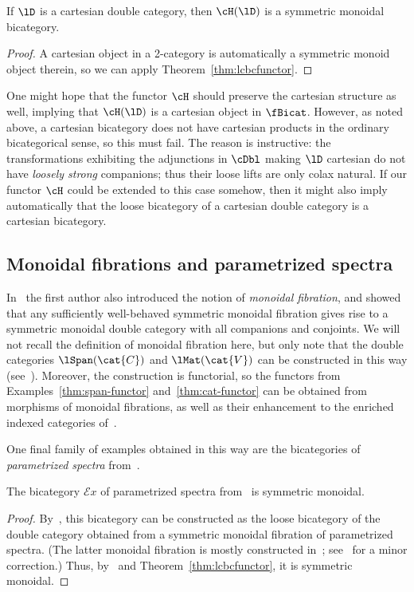 \begin{thm}
  If $\lD$ is a cartesian double category, then $\cH(\lD)$ is a symmetric monoidal bicategory.
\end{thm}
\begin{proof}
  A cartesian object in a 2-category is automatically a symmetric monoid object therein, so we can apply Theorem~\ref{thm:lcbcfunctor}.
\end{proof}

One might hope that the functor $\cH$ should preserve the cartesian structure as well, implying that $\cH(\lD)$ is a cartesian object in $\fBicat$.
However, as noted above, a cartesian bicategory does not have cartesian products in the ordinary bicategorical sense, so this must fail.
The reason is instructive: the transformations exhibiting the adjunctions in $\cDbl$ making $\lD$ cartesian do not have \emph{loosely strong} companions; thus their loose lifts are only colax natural.
If our functor $\cH$ could be extended to this case somehow, then it might also imply automatically that the loose bicategory of a cartesian double category is a cartesian bicategory.


\subsection{Monoidal fibrations and parametrized spectra}
\label{sec:mfps}

In~\cite{shulman:frbi} the first author also introduced the notion of \emph{monoidal fibration}, and showed that any sufficiently well-behaved symmetric monoidal fibration gives rise to a symmetric monoidal double category with all companions and conjoints.
We will not recall the definition of monoidal fibration here, but only note that the double categories $\lSpan(\cat{C})$ and $\lMat(\cat{V})$ can be constructed in this way (see~\cite[Examples 15.3 and 15.4]{shulman:frbi}).
Moreover, the construction is functorial, so the functors from Examples~\ref{thm:span-functor} and~\ref{thm:cat-functor} can be obtained from morphisms of monoidal fibrations, as well as their enhancement to the enriched indexed categories of~\cite{shulman:eicats}.

One final family of examples obtained in this way are the bicategories of \emph{parametrized spectra} from~\cite{maysig:pht}.

\begin{thm}
  The bicategory $\mathcal{E}\mathit{x}$ of parametrized spectra from~\cite[Chapter 17]{maysig:pht} is symmetric monoidal.
\end{thm}
\begin{proof}
  By~\cite[Example 14.6]{shulman:frbi}, this bicategory can be constructed as the loose bicategory of the double category obtained from a symmetric monoidal fibration of parametrized spectra.
  (The latter monoidal fibration is mostly constructed in~\cite{maysig:pht}; see~\cite{malkiewich:ex-lowtech} for a minor correction.)
  Thus, by~\cite[Theorem 14.2]{shulman:frbi} and Theorem~\ref{thm:lcbcfunctor}, it is symmetric monoidal.
\end{proof}

